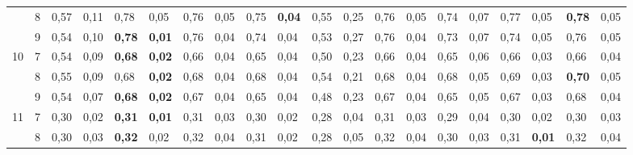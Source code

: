 \documentclass[conference]{IEEEtran}
\begin{document}
\begin{table}[]
\begin{tabular}{|cl|ll|ll|ll|ll|ll|ll|ll|ll|ll|}
		\multicolumn{1}{|c|}{} & 8 & \multicolumn{1}{l|}{0,57} & 0,11 & \multicolumn{1}{l|}{0,78} & 0,05 & \multicolumn{1}{l|}{0,76} & 0,05 & \multicolumn{1}{l|}{0,75} & \textbf{0,04} & \multicolumn{1}{l|}{0,55} & 0,25 & \multicolumn{1}{l|}{0,76} & 0,05 & \multicolumn{1}{l|}{0,74} & 0,07 & \multicolumn{1}{l|}{0,77} & 0,05 & \multicolumn{1}{l|}{\textbf{0,78}} & 0,05 \\ \cline{2-20} 
		\multicolumn{1}{|c|}{} & 9 & \multicolumn{1}{l|}{0,54} & 0,10 & \multicolumn{1}{l|}{\textbf{0,78}} & \textbf{0,01} & \multicolumn{1}{l|}{0,76} & 0,04 & \multicolumn{1}{l|}{0,74} & 0,04 & \multicolumn{1}{l|}{0,53} & 0,27 & \multicolumn{1}{l|}{0,76} & 0,04 & \multicolumn{1}{l|}{0,73} & 0,07 & \multicolumn{1}{l|}{0,74} & 0,05 & \multicolumn{1}{l|}{0,76} & 0,05 \\ \hline
		\multicolumn{1}{|c|}{\multirow{3}{*}{10}} & 7 & \multicolumn{1}{l|}{0,54} & 0,09 & \multicolumn{1}{l|}{\textbf{0,68}} & \textbf{0,02} & \multicolumn{1}{l|}{0,66} & 0,04 & \multicolumn{1}{l|}{0,65} & 0,04 & \multicolumn{1}{l|}{0,50} & 0,23 & \multicolumn{1}{l|}{0,66} & 0,04 & \multicolumn{1}{l|}{0,65} & 0,06 & \multicolumn{1}{l|}{0,66} & 0,03 & \multicolumn{1}{l|}{0,66} & 0,04 \\ \cline{2-20} 
		\multicolumn{1}{|c|}{} & 8 & \multicolumn{1}{l|}{0,55} & 0,09 & \multicolumn{1}{l|}{0,68} & \textbf{0,02} & \multicolumn{1}{l|}{0,68} & 0,04 & \multicolumn{1}{l|}{0,68} & 0,04 & \multicolumn{1}{l|}{0,54} & 0,21 & \multicolumn{1}{l|}{0,68} & 0,04 & \multicolumn{1}{l|}{0,68} & 0,05 & \multicolumn{1}{l|}{0,69} & 0,03 & \multicolumn{1}{l|}{\textbf{0,70}} & 0,05 \\ \cline{2-20} 
		\multicolumn{1}{|c|}{} & 9 & \multicolumn{1}{l|}{0,54} & 0,07 & \multicolumn{1}{l|}{\textbf{0,68}} & \textbf{0,02} & \multicolumn{1}{l|}{0,67} & 0,04 & \multicolumn{1}{l|}{0,65} & 0,04 & \multicolumn{1}{l|}{0,48} & 0,23 & \multicolumn{1}{l|}{0,67} & 0,04 & \multicolumn{1}{l|}{0,65} & 0,05 & \multicolumn{1}{l|}{0,67} & 0,03 & \multicolumn{1}{l|}{0,68} & 0,04 \\ \hline
		\multicolumn{1}{|c|}{\multirow{3}{*}{11}} & 7 & \multicolumn{1}{l|}{0,30} & 0,02 & \multicolumn{1}{l|}{\textbf{0,31}} & \textbf{0,01} & \multicolumn{1}{l|}{0,31} & 0,03 & \multicolumn{1}{l|}{0,30} & 0,02 & \multicolumn{1}{l|}{0,28} & 0,04 & \multicolumn{1}{l|}{0,31} & 0,03 & \multicolumn{1}{l|}{0,29} & 0,04 & \multicolumn{1}{l|}{0,30} & 0,02 & \multicolumn{1}{l|}{0,30} & 0,03 \\ \cline{2-20} 
		\multicolumn{1}{|c|}{} & 8 & \multicolumn{1}{l|}{0,30} & 0,03 & \multicolumn{1}{l|}{\textbf{0,32}} & 0,02 & \multicolumn{1}{l|}{0,32} & 0,04 & \multicolumn{1}{l|}{0,31} & 0,02 & \multicolumn{1}{l|}{0,28} & 0,05 & \multicolumn{1}{l|}{0,32} & 0,04 & \multicolumn{1}{l|}{0,30} & 0,03 & \multicolumn{1}{l|}{0,31} & \textbf{0,01} & \multicolumn{1}{l|}{0,32} & 0,04 \\ \cline{2-20} 

\end{tabular}
\end{table}
\end{document}
